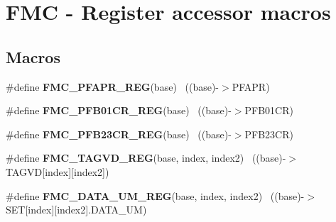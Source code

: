\hypertarget{group___f_m_c___register___accessor___macros}{}\section{F\+M\+C -\/ Register accessor macros}
\label{group___f_m_c___register___accessor___macros}
\subsection*{Macros}
\begin{DoxyCompactItemize}
\item 
\hypertarget{group___f_m_c___register___accessor___macros_gad43fcfd90789921daaef07d85d5da199}{}\#define {\bfseries F\+M\+C\+\_\+\+P\+F\+A\+P\+R\+\_\+\+R\+E\+G}(base)                                        ~((base)-\/$>$P\+F\+A\+P\+R)\label{group___f_m_c___register___accessor___macros_gad43fcfd90789921daaef07d85d5da199}

\item 
\hypertarget{group___f_m_c___register___accessor___macros_ga7d70293780cbcd74b3b8491a76c562ce}{}\#define {\bfseries F\+M\+C\+\_\+\+P\+F\+B01\+C\+R\+\_\+\+R\+E\+G}(base)                                    ~((base)-\/$>$P\+F\+B01\+C\+R)\label{group___f_m_c___register___accessor___macros_ga7d70293780cbcd74b3b8491a76c562ce}

\item 
\hypertarget{group___f_m_c___register___accessor___macros_gae26e21fa24046a3b4b97584b087347fa}{}\#define {\bfseries F\+M\+C\+\_\+\+P\+F\+B23\+C\+R\+\_\+\+R\+E\+G}(base)                                    ~((base)-\/$>$P\+F\+B23\+C\+R)\label{group___f_m_c___register___accessor___macros_gae26e21fa24046a3b4b97584b087347fa}

\item 
\hypertarget{group___f_m_c___register___accessor___macros_ga69adb2f34bbe33d04c2075cee0e7d5f4}{}\#define {\bfseries F\+M\+C\+\_\+\+T\+A\+G\+V\+D\+\_\+\+R\+E\+G}(base,  index,  index2)              ~((base)-\/$>$T\+A\+G\+V\+D\mbox{[}index\mbox{]}\mbox{[}index2\mbox{]})\label{group___f_m_c___register___accessor___macros_ga69adb2f34bbe33d04c2075cee0e7d5f4}

\item 
\hypertarget{group___f_m_c___register___accessor___macros_ga03e59501ecd54861f171ffded313122c}{}\#define {\bfseries F\+M\+C\+\_\+\+D\+A\+T\+A\+\_\+\+U\+M\+\_\+\+R\+E\+G}(base,  index,  index2)          ~((base)-\/$>$S\+E\+T\mbox{[}index\mbox{]}\mbox{[}index2\mbox{]}.D\+A\+T\+A\+\_\+\+U\+M)\label{group___f_m_c___register___accessor___macros_ga03e59501ecd54861f171ffded313122c}


\end{DoxyCompactItemize}
